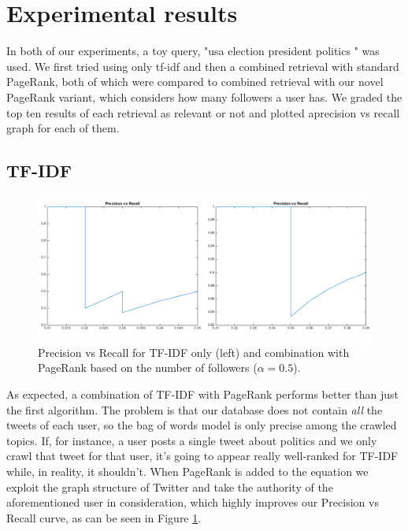 \section{Experimental results}

In both of our experiments, a toy query, "usa election president politics " was
used. We first tried using only tf-idf and then a combined retrieval with standard 
PageRank, both of which were compared to combined retrieval with our novel PageRank variant, 
which considers how many followers a user has. We graded the top ten results of each retrieval 
as relevant or not and plotted aprecision vs recall graph for each of them.

\subsection{TF-IDF}

\begin{figure}[H]
\centering
\includegraphics[width=5.5in,natwidth=534,natheight=345]{images/exptfidf.png}
\caption{Precision vs Recall for TF-IDF only (left) and combination with PageRank based on the number of followers ($\alpha = 0.5$).}
\label{fig:exptfidf}
\end{figure}

As expected, a combination of TF-IDF with PageRank performs better than just the
first algorithm.  The problem is that our database does not contain \emph{all}
the tweets of each user, so the bag of words model is only precise among the
crawled topics. If, for instance, a user posts a single tweet about politics and
we only crawl that tweet for that user, it's going to appear really well-ranked
for TF-IDF while, in reality, it shouldn't. When PageRank is added to the
equation we exploit the graph structure of Twitter and take the authority of the
aforementioned user in consideration, which highly improves our Precision vs
Recall curve, as can be seen in Figure \ref{fig:exptfidf}.

